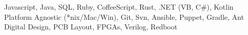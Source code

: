 {Javascript, Java, SQL, Ruby, CoffeeScript, Rust, .NET (VB, C\#), Kotlin}
{Platform Agnostic (*nix/Mac/Win), Git, Svn, Ansible, Puppet, Gradle, Ant}
{Digital Design, PCB Layout, FPGAs, Verilog, Redboot}
